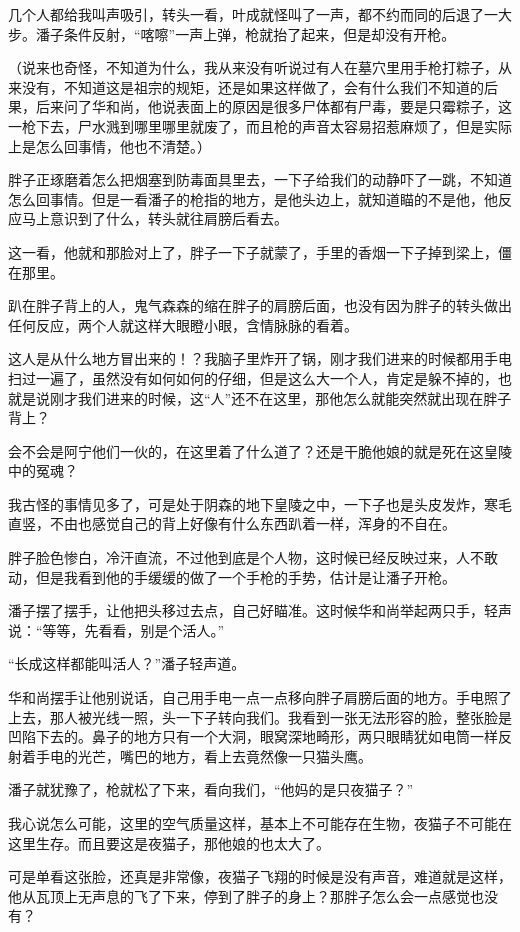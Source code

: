 几个人都给我叫声吸引，转头一看，叶成就怪叫了一声，都不约而同的后退了一大步。潘子条件反射，“喀嚓”一声上弹，枪就抬了起来，但是却没有开枪。

（说来也奇怪，不知道为什么，我从来没有听说过有人在墓穴里用手枪打粽子，从来没有，不知道这是祖宗的规矩，还是如果这样做了，会有什么我们不知道的后果，后来问了华和尚，他说表面上的原因是很多尸体都有尸毒，要是只霉粽子，这一枪下去，尸水溅到哪里哪里就废了，而且枪的声音太容易招惹麻烦了，但是实际上是怎么回事情，他也不清楚。）

胖子正琢磨着怎么把烟塞到防毒面具里去，一下子给我们的动静吓了一跳，不知道怎么回事情。但是一看潘子的枪指的地方，是他头边上，就知道瞄的不是他，他反应马上意识到了什么，转头就往肩膀后看去。

这一看，他就和那脸对上了，胖子一下子就蒙了，手里的香烟一下子掉到梁上，僵在那里。

趴在胖子背上的人，鬼气森森的缩在胖子的肩膀后面，也没有因为胖子的转头做出任何反应，两个人就这样大眼瞪小眼，含情脉脉的看着。

这人是从什么地方冒出来的！？我脑子里炸开了锅，刚才我们进来的时候都用手电扫过一遍了，虽然没有如何如何的仔细，但是这么大一个人，肯定是躲不掉的，也就是说刚才我们进来的时候，这“人”还不在这里，那他怎么就能突然就出现在胖子背上？

会不会是阿宁他们一伙的，在这里着了什么道了？还是干脆他娘的就是死在这皇陵中的冤魂？

我古怪的事情见多了，可是处于阴森的地下皇陵之中，一下子也是头皮发炸，寒毛直竖，不由也感觉自己的背上好像有什么东西趴着一样，浑身的不自在。

胖子脸色惨白，冷汗直流，不过他到底是个人物，这时候已经反映过来，人不敢动，但是我看到他的手缓缓的做了一个手枪的手势，估计是让潘子开枪。

潘子摆了摆手，让他把头移过去点，自己好瞄准。这时候华和尚举起两只手，轻声说：“等等，先看看，别是个活人。”

“长成这样都能叫活人？”潘子轻声道。

华和尚摆手让他别说话，自己用手电一点一点移向胖子肩膀后面的地方。手电照了上去，那人被光线一照，头一下子转向我们。我看到一张无法形容的脸，整张脸是凹陷下去的。鼻子的地方只有一个大洞，眼窝深地畸形，两只眼睛犹如电筒一样反射着手电的光芒，嘴巴的地方，看上去竟然像一只猫头鹰。

潘子就犹豫了，枪就松了下来，看向我们，“他妈的是只夜猫子？”

我心说怎么可能，这里的空气质量这样，基本上不可能存在生物，夜猫子不可能在这里生存。而且要这是夜猫子，那他娘的也太大了。

可是单看这张脸，还真是非常像，夜猫子飞翔的时候是没有声音，难道就是这样，他从瓦顶上无声息的飞了下来，停到了胖子的身上？那胖子怎么会一点感觉也没有？

